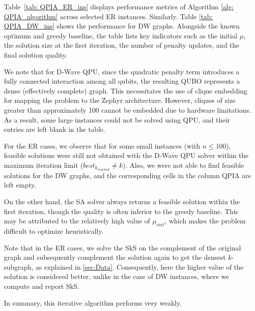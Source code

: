 \documentclass{article}
\newcommand{\Omkar}[1]{{\color{teal}#1}}
\begin{document}
Table~\ref{tab: QPIA_ER_ins} displays performance metrics of Algorithm \ref{alg: QPIA_algorithm} across selected  ER  instances. Similarly. Table \ref{tab: QPIA_DW_ins} shows the performance for  DW graphs. Alongside the known optimum and greedy baseline, the table lists key indicators such as the initial $\mu$, the solution size at the first iteration, the number of penalty updates, and the final solution quality. 

We note that for D-Wave QPU, since the quadratic penalty term introduces a fully connected interaction among all qubits, the resulting QUBO represents a dense (effectively complete) graph. This necessitates the use of clique embedding for mapping the problem to the Zephyr architecture. However, cliques of size greater than approximately 100 cannot be embedded due to hardware limitations. As a result, some large instances could not be solved using QPU, and their entries are left blank in the table.


For the  ER  cases, we observe that for some small instances (with $n \leq 100$), feasible solutions were still not obtained with the D-Wave QPU solver within the maximum iteration limit ($best_{k_{reached}}\neq k$). Also, we were not able to find feasible solutions for the  DW graphs, and the corresponding cells in the column QPIA are left empty.

On the other hand, the SA solver always returns a feasible solution within the first iteration, though the quality is often inferior to the greedy baseline. This may be attributed to the relatively high value of $\mu_{init}$, which makes the problem difficult to optimize heuristically.  

Note that in the  ER  cases, we solve the SkS on the complement of the original graph and subsequently complement the solution again to get the densest $k$-subgraph, as explained in \ref{sec:Data}. Consequently, here the higher value of the solution is considered better, unlike in the case of  DW instances, where we compute and report SkS.

In summary, this iterative algorithm performs very weakly.

\end{document}
